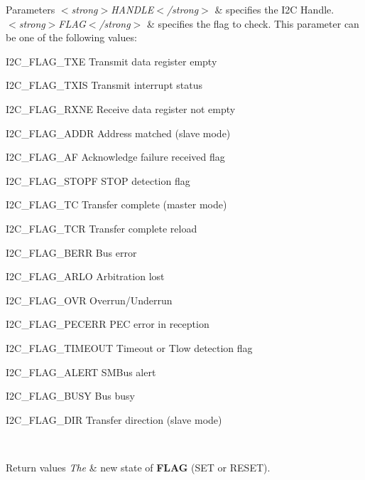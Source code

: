 \begin{DoxyParams}{Parameters}
{\em $<$strong$>$\+H\+A\+N\+D\+L\+E$<$/strong$>$} & specifies the I2C Handle. \\
\hline
{\em $<$strong$>$\+F\+L\+A\+G$<$/strong$>$} & specifies the flag to check. This parameter can be one of the following values\+: \begin{DoxyItemize}
\item I2\+C\+\_\+\+F\+L\+A\+G\+\_\+\+T\+XE Transmit data register empty \item I2\+C\+\_\+\+F\+L\+A\+G\+\_\+\+T\+X\+IS Transmit interrupt status \item I2\+C\+\_\+\+F\+L\+A\+G\+\_\+\+R\+X\+NE Receive data register not empty \item I2\+C\+\_\+\+F\+L\+A\+G\+\_\+\+A\+D\+DR Address matched (slave mode) \item I2\+C\+\_\+\+F\+L\+A\+G\+\_\+\+AF Acknowledge failure received flag \item I2\+C\+\_\+\+F\+L\+A\+G\+\_\+\+S\+T\+O\+PF S\+T\+OP detection flag \item I2\+C\+\_\+\+F\+L\+A\+G\+\_\+\+TC Transfer complete (master mode) \item I2\+C\+\_\+\+F\+L\+A\+G\+\_\+\+T\+CR Transfer complete reload \item I2\+C\+\_\+\+F\+L\+A\+G\+\_\+\+B\+E\+RR Bus error \item I2\+C\+\_\+\+F\+L\+A\+G\+\_\+\+A\+R\+LO Arbitration lost \item I2\+C\+\_\+\+F\+L\+A\+G\+\_\+\+O\+VR Overrun/\+Underrun \item I2\+C\+\_\+\+F\+L\+A\+G\+\_\+\+P\+E\+C\+E\+RR P\+EC error in reception \item I2\+C\+\_\+\+F\+L\+A\+G\+\_\+\+T\+I\+M\+E\+O\+UT Timeout or Tlow detection flag \item I2\+C\+\_\+\+F\+L\+A\+G\+\_\+\+A\+L\+E\+RT S\+M\+Bus alert \item I2\+C\+\_\+\+F\+L\+A\+G\+\_\+\+B\+U\+SY Bus busy \item I2\+C\+\_\+\+F\+L\+A\+G\+\_\+\+D\+IR Transfer direction (slave mode)\end{DoxyItemize}
\\
\hline
\end{DoxyParams}

\begin{DoxyRetVals}{Return values}
{\em The} & new state of {\bfseries{F\+L\+AG}} (S\+ET or R\+E\+S\+ET). \\
\hline
\end{DoxyRetVals}
